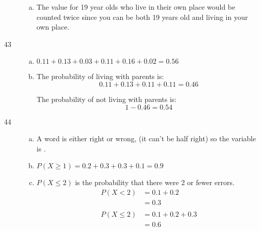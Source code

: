 \documentclass[letterpaper, landscape]{exam}
\begin{document}
\begin{description}
\begin{enumerate}[(a)]
          \item The value for 19 year olds who live in their own place would be
            counted twice since you can be both 19 years old and living in your own place.

        \end{enumerate}  

      \item[43]
        \begin{enumerate}[(a)]
          \item $0.11 + 0.13 + 0.03 + 0.11 + 0.16 + 0.02 = \boxed{ 0.56 }$

          \item The probability of living with parents is:
            \[
              0.11 + 0.13 + 0.11 + 0.11 = 0.46
            \]

            The probability of not living with parents is:
            \[
              1 - 0.46 = \boxed{ 0.54 }
            \]
        \end{enumerate}  

      \item[44]
        \begin{enumerate}[(a)]
          \item A word is either right or wrong, (it can't be half right) so the
            variable is .

          \item $P(X \geq 1) = 0.2 + 0.3 + 0.3 + 0.1 = \boxed{ 0.9 }$

          \item $P(X \leq 2)$ is the probability that there were 2 or fewer errors.
            \begin{align*}
              P(X < 2) & = 0.1 + 0.2 \\
                       & = \boxed{ 0.3 } \\
              \\
              P(X \leq 2) & = 0.1 + 0.2 + 0.3 \\
                          & = \boxed{ 0.6 } \\
            \end{align*}
        \end{enumerate}  



\end{description}
\end{document}
